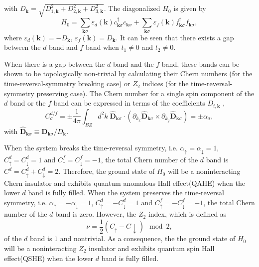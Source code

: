 \documentclass[amsmath,superscriptaddress,showpacs,aps,prb,twocolumn]{revtex4-1}
\begin{document}
with $D_{\mathbf{k}}=\sqrt{D^2_{1,\mathbf{k}}+D^2_{2,\mathbf{k}}+D^2_{3,\mathbf{k}}}$. The diagonalized $H_0$ is given by
\begin{equation}
H_{0}=\sum_{\mathbf{k}\sigma}\varepsilon_{d}(\mathbf{k})c^{\dagger}_{\mathbf{k}\sigma}c_{\mathbf{k}\sigma}
      +\sum_{\mathbf{k}\sigma}\varepsilon_{f}(\mathbf{k})f^{\dagger}_{\mathbf{k}\sigma}f_{\mathbf{k}\sigma},
\end{equation}
where $\varepsilon_{d}(\mathbf{k})=-D_{\mathbf{k}}$, $\varepsilon_{f}(\mathbf{k})=D_{\mathbf{k}}$. It can be seen that there exists a gap between the $d$ band and $f$ band when $t_1\ne0$ and $t_2\ne0$.
\par When there is a gap between the $d$ band and the $f$ band, these bands can be shown to be topologically non-trivial by calculating their Chern numbers \cite{TKNN_PRL1982} (for the time-reversal-symmetry breaking case) or $Z_2$ indices \cite{KM_PRL2005b,SWSH_PRL2006} (for the time-reversal-symmetry preserving case). The Chern number for a single spin component of the $d$ band or the $f$ band can be expressed in terms of the coefficients $D_{i,\mathbf{k}}$ \cite{HK_RMP2010,QZ_RMP2011},
\begin{equation}
C_{\sigma}^{d/f}=\pm\frac{1}{4\pi}\int_{BZ}d^{2}k\;
    \hat{\mathbf{D}}_{\mathbf{k}\sigma}\cdot(\partial_{k_{x}}\hat{\mathbf{D}}_{\mathbf{k}\sigma}\times\partial_{k_{y}}\hat{\mathbf{D}}_{\mathbf{k}\sigma})
    =\pm\alpha_\sigma,
\end{equation}
with $\hat{\mathbf{D}}_{\mathbf{k}\sigma}\equiv\mathbf{D}_{\mathbf{k}\sigma}/D_{\mathbf{k}}$.
\par When the system breaks the time-reversal symmetry, i.e. $\alpha_\uparrow=\alpha_\downarrow=1$, $C_\uparrow^d=C_\downarrow^d=1$ and $C_\uparrow^f=C_\downarrow^f=-1$, the total Chern number of the $d$ band is $C^d=C_\uparrow^d+C_\downarrow^d=2$. Therefore, the ground state of $H_0$ will be a noninteracting Chern insulator and exhibits quantum anomalous Hall effect(QAHE) when the lower $d$ band is fully filled. When the system preserves the time-reversal symmetry, i.e. $\alpha_\uparrow=-\alpha_\downarrow=1$, $C_\uparrow^d=-C_\downarrow^d=1$ and $C_\uparrow^f=-C_\downarrow^f=-1$, the total Chern number of the $d$ band is zero. However, the $Z_2$ index, which is defined as
\begin{equation}
\nu=\frac{1}{2}(C_{\uparrow}-C{\downarrow})\mod2,
\end{equation}
of the $d$ band is $1$ and nontrivial. As a consequence, the the ground state of $H_0$ will be a noninteracting $Z_2$ insulator and exhibits quantum spin Hall effect(QSHE) when the lower $d$ band is fully filled.
\end{document}
